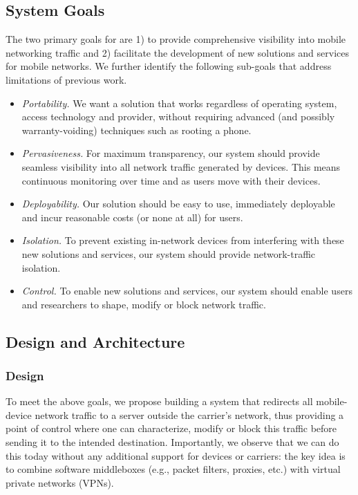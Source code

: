 \subsection{System Goals}
The two primary goals for \meddle are 1) to provide comprehensive visibility into 
mobile networking traffic and 2) facilitate the development of new solutions 
and services for mobile networks. We further identify the following sub-goals 
that address limitations of previous work.

\begin{itemize}
\item \emph{Portability.} We want a solution that works regardless of operating system, 
access technology and provider, without requiring advanced (and possibly warranty-voiding) 
techniques such as rooting a phone. 
\item \emph{Pervasiveness.} For maximum transparency, our system should provide seamless 
visibility into all network traffic generated by devices. This means continuous monitoring 
over time and as users move with their devices.
\item \emph{Deployability.} Our solution should be easy to use, immediately deployable 
and incur reasonable costs (or none at all) for users. 
\item \emph{Isolation.} To prevent existing in-network devices from interfering with these new 
solutions and services, our system should provide network-traffic isolation. 
\item \emph{Control.} To enable new solutions and services, our system should enable users and researchers 
to shape, modify or block network traffic. 
\end{itemize}

\subsection{Design and Architecture}

\subsubsection{Design}
To meet the above goals, we propose building a system that redirects all mobile-device 
network traffic to a server outside the carrier's network, thus providing a point of control 
where one can characterize, modify or block this traffic before sending it to the intended 
destination. Importantly, we observe that we can do this today without any additional 
support for devices or carriers: the key idea is to combine software middleboxes (e.g., 
packet filters, proxies, etc.) with virtual private networks (VPNs). 

